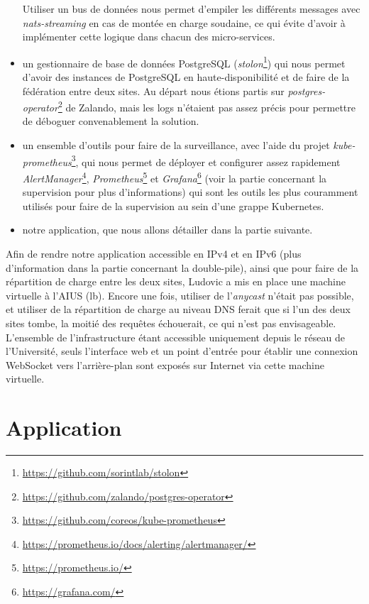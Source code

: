 \begin{itemize}
  Utiliser un bus de données nous permet d'empiler les différents
  messages avec \textit{nats-streaming} en cas de montée en charge
  soudaine, ce qui évite d'avoir à implémenter cette logique dans chacun
  des micro-services.
\item
  un gestionnaire de base de données PostgreSQL
  (\textit{stolon}\footnote{\url{https://github.com/sorintlab/stolon}})
  qui nous permet d'avoir des instances de PostgreSQL en
  haute-disponibilité et de faire de la fédération entre deux sites. Au
  départ nous étions partis sur
  \textit{postgres-operator}\footnote{
    \url{https://github.com/zalando/postgres-operator}}
  de Zalando, mais les logs n'étaient pas assez précis pour permettre de
  déboguer convenablement la solution.
\item
  un ensemble d'outils pour faire de la surveillance, avec l'aide du
  projet \textit{kube-prometheus}\footnote{
    \url{https://github.com/coreos/kube-prometheus}},
  qui nous permet de déployer et configurer assez rapidement
  \textit{AlertManager}\footnote{
    \url{https://prometheus.io/docs/alerting/alertmanager/}},
  \textit{Prometheus}\footnote{\url{https://prometheus.io/}} et
  \textit{Grafana}\footnote{\url{https://grafana.com/}} (voir
  la partie concernant la supervision pour plus d'informations) qui sont
  les outils les plus couramment utilisés pour faire de la supervision
  au sein d'une grappe Kubernetes.
\item
  notre application, que nous allons détailler dans la partie suivante.
\end{itemize}

Afin de rendre notre application accessible en IPv4 et en IPv6 (plus
d'information dans la partie concernant la double-pile), ainsi que pour
faire de la répartition de charge entre les deux sites, Ludovic a mis en
place une machine virtuelle à l'AIUS (lb). Encore une fois, utiliser de
l'\textit{anycast} n'était pas possible, et utiliser de la répartition de
charge au niveau DNS ferait que si l'un des deux sites tombe, la moitié
des requêtes échouerait, ce qui n'est pas envisageable. L'ensemble de
l'infrastructure étant accessible uniquement depuis le réseau de
l'Université, seuls l'interface web et un point d'entrée pour établir
une connexion WebSocket vers l'arrière-plan sont exposés sur Internet
via cette machine virtuelle.

\section{Application}


